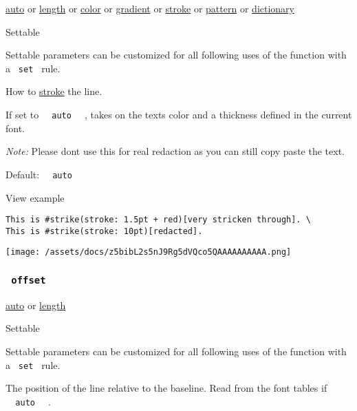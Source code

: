 \href{/docs/reference/foundations/auto/}{auto} {or}
\href{/docs/reference/layout/length/}{length} {or}
\href{/docs/reference/visualize/color/}{color} {or}
\href{/docs/reference/visualize/gradient/}{gradient} {or}
\href{/docs/reference/visualize/stroke/}{stroke} {or}
\href{/docs/reference/visualize/pattern/}{pattern} {or}
\href{/docs/reference/foundations/dictionary/}{dictionary}

{{ Settable }}

\label{parameters-stroke-settable-tooltip}
Settable parameters can be customized for all following uses of the
function with a \texttt{\ set\ } rule.

How to \href{/docs/reference/visualize/stroke/}{stroke} the line.

If set to \texttt{\ }{\texttt{\ auto\ }}\texttt{\ } , takes on the
text\textquotesingle s color and a thickness defined in the current
font.

\emph{Note:} Please don\textquotesingle t use this for real redaction as
you can still copy paste the text.

Default: \texttt{\ }{\texttt{\ auto\ }}\texttt{\ }


View example

\begin{verbatim}
This is #strike(stroke: 1.5pt + red)[very stricken through]. \
This is #strike(stroke: 10pt)[redacted].
\end{verbatim}

\texttt{[image: /assets/docs/z5bibL2s5nJ9Rg5dVQco5QAAAAAAAAAA.png]}

\subsubsection{\texorpdfstring{\texttt{\ offset\ }}{ offset }}\label{parameters-offset}

\href{/docs/reference/foundations/auto/}{auto} {or}
\href{/docs/reference/layout/length/}{length}

{{ Settable }}

\label{parameters-offset-settable-tooltip}
Settable parameters can be customized for all following uses of the
function with a \texttt{\ set\ } rule.

The position of the line relative to the baseline. Read from the font
tables if \texttt{\ }{\texttt{\ auto\ }}\texttt{\ } .

